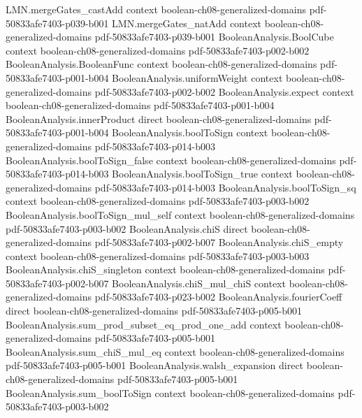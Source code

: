\begin{theorem}
\proofstep
  {LMN.mergeGates_castAdd}
  {context}
  {boolean-ch08-generalized-domains}
  {pdf-50833afe7403-p039-b001}
\proofstep
  {LMN.mergeGates_natAdd}
  {context}
  {boolean-ch08-generalized-domains}
  {pdf-50833afe7403-p039-b001}
\proofstep
  {BooleanAnalysis.BoolCube}
  {context}
  {boolean-ch08-generalized-domains}
  {pdf-50833afe7403-p002-b002}
\proofstep
  {BooleanAnalysis.BooleanFunc}
  {context}
  {boolean-ch08-generalized-domains}
  {pdf-50833afe7403-p001-b004}
\proofstep
  {BooleanAnalysis.uniformWeight}
  {context}
  {boolean-ch08-generalized-domains}
  {pdf-50833afe7403-p002-b002}
\proofstep
  {BooleanAnalysis.expect}
  {context}
  {boolean-ch08-generalized-domains}
  {pdf-50833afe7403-p001-b004}
\proofstep
  {BooleanAnalysis.innerProduct}
  {direct}
  {boolean-ch08-generalized-domains}
  {pdf-50833afe7403-p001-b004}
\proofstep
  {BooleanAnalysis.boolToSign}
  {context}
  {boolean-ch08-generalized-domains}
  {pdf-50833afe7403-p014-b003}
\proofstep
  {BooleanAnalysis.boolToSign_false}
  {context}
  {boolean-ch08-generalized-domains}
  {pdf-50833afe7403-p014-b003}
\proofstep
  {BooleanAnalysis.boolToSign_true}
  {context}
  {boolean-ch08-generalized-domains}
  {pdf-50833afe7403-p014-b003}
\proofstep
  {BooleanAnalysis.boolToSign_sq}
  {context}
  {boolean-ch08-generalized-domains}
  {pdf-50833afe7403-p003-b002}
\proofstep
  {BooleanAnalysis.boolToSign_mul_self}
  {context}
  {boolean-ch08-generalized-domains}
  {pdf-50833afe7403-p003-b002}
\proofstep
  {BooleanAnalysis.chiS}
  {direct}
  {boolean-ch08-generalized-domains}
  {pdf-50833afe7403-p002-b007}
\proofstep
  {BooleanAnalysis.chiS_empty}
  {context}
  {boolean-ch08-generalized-domains}
  {pdf-50833afe7403-p003-b003}
\proofstep
  {BooleanAnalysis.chiS_singleton}
  {context}
  {boolean-ch08-generalized-domains}
  {pdf-50833afe7403-p002-b007}
\proofstep
  {BooleanAnalysis.chiS_mul_chiS}
  {context}
  {boolean-ch08-generalized-domains}
  {pdf-50833afe7403-p023-b002}
\proofstep
  {BooleanAnalysis.fourierCoeff}
  {direct}
  {boolean-ch08-generalized-domains}
  {pdf-50833afe7403-p005-b001}
\proofstep
  {BooleanAnalysis.sum_prod_subset_eq_prod_one_add}
  {context}
  {boolean-ch08-generalized-domains}
  {pdf-50833afe7403-p005-b001}
\proofstep
  {BooleanAnalysis.sum_chiS_mul_eq}
  {context}
  {boolean-ch08-generalized-domains}
  {pdf-50833afe7403-p005-b001}
\proofstep
  {BooleanAnalysis.walsh_expansion}
  {direct}
  {boolean-ch08-generalized-domains}
  {pdf-50833afe7403-p005-b001}
\proofstep
  {BooleanAnalysis.sum_boolToSign}
  {context}
  {boolean-ch08-generalized-domains}
  {pdf-50833afe7403-p003-b002}

\end{theorem}
